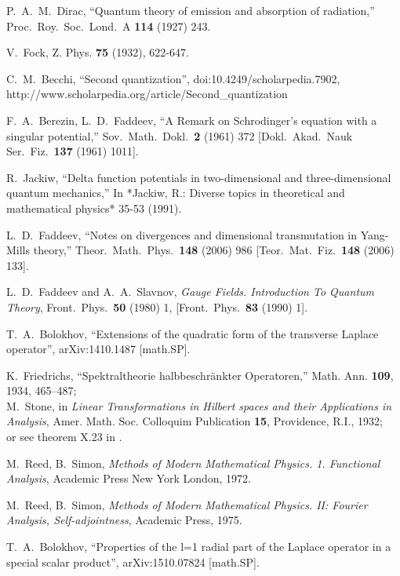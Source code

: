 \documentclass[12pt]{article}
\begin{document}
\begin{thebibliography}{0}

P.~A.~M.~Dirac,
``Quantum theory of emission and absorption of radiation,''
Proc.\ Roy.\ Soc.\ Lond.\ A {\bf 114} (1927) 243.

V.~Fock, Z. Phys. {\bf 75} (1932), 622-647.

C.~M.~Becchi,
``Second quantization'', doi:10.4249/scholarpedia.7902,
http://www.scholarpedia.org/article/Second\_quantization

    F.~A.~Berezin, L.~D.~Faddeev,
  ``A Remark on Schrodinger's equation with a singular potential,''
  Sov.\ Math.\ Dokl.\  {\bf 2} (1961) 372
  [Dokl.\ Akad.\ Nauk Ser.\ Fiz.\  {\bf 137} (1961) 1011].

  R.~Jackiw,
  ``Delta function potentials in two-dimensional and three-dimensional
  quantum mechanics,''
  In *Jackiw, R.: Diverse topics in theoretical and mathematical physics*
  35-53 (1991).

L.~D.~Faddeev,
``Notes on divergences and dimensional transmutation in Yang-Mills theory,''
Theor.\ Math.\ Phys.\  {\bf 148} (2006) 986
[Teor.\ Mat.\ Fiz.\  {\bf 148} (2006) 133].

  L.~D.~Faddeev and A.~A.~Slavnov,
\emph{Gauge Fields. Introduction To Quantum Theory},
Front.\ Phys.\  {\bf 50} (1980) 1, [Front.\ Phys.\  {\bf 83} (1990) 1].

 T.~A.~Bolokhov,
``Extensions of the quadratic form of the transverse Laplace operator'',
arXiv:1410.1487 [math.SP].

    K.~Friedrichs, ``Spektraltheorie halbbeschr\"ankter Operatoren,''
    Math. Ann. {\bf 109}, 1934, 465--487;\\
    M.~Stone, in \emph{Linear Transformations in Hilbert spaces and their
    Applications in Analysis}, Amer. Math. Soc. Colloquim Publication {\bf 15},
    Providence, R.I., 1932;\\
    or see theorem X.23 in \cite{RS2}.

  M.~Reed, B.~Simon, \emph{Methods of Modern Mathematical
Physics. 1. Functional Analysis}, Academic Press New York London, 1972.

 M.~Reed, B.~Simon, \emph{Methods of Modern Mathematical Physics.
II: Fourier Analysis, Self-adjointness}, Academic Press, 1975.

 T.~A.~Bolokhov,
``Properties of the l=1 radial part of the Laplace operator in a special
scalar product'', arXiv:1510.07824 [math.SP].
    

\end{thebibliography}
\end{document}
